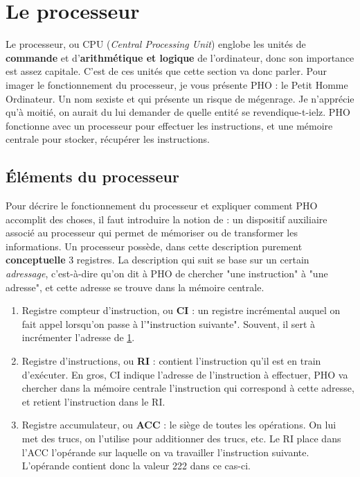 \documentclass[12pt,a4paper]{report}
\begin{document}
\section{Le processeur}
Le processeur, ou CPU (\textit{Central Processing Unit}) englobe les unités de \textbf{commande} et d'\textbf{arithmétique et logique} de l'ordinateur, donc son importance est assez capitale. C'est de ces unités que cette section va donc parler. Pour imager le fonctionnement du processeur, je vous présente PHO : le Petit Homme Ordinateur. Un nom sexiste et qui présente un risque de mégenrage. Je n'apprécie qu'à moitié, on aurait du lui demander de quelle entité se revendique-t-ielz. PHO fonctionne avec un processeur pour effectuer les instructions, et une mémoire centrale pour stocker, récupérer les instructions.
\subsection{Éléments du processeur}
Pour décrire le fonctionnement du processeur et expliquer comment PHO accomplit des choses, il faut introduire la notion de  : un dispositif auxiliaire associé au processeur qui permet de mémoriser ou de transformer les informations. Un processeur possède, dans cette description purement \textbf{conceptuelle} 3 registres. La description qui suit se base sur un certain \textit{adressage}, c'est-à-dire qu'on dit à PHO de chercher "une instruction" à "une adresse", et cette adresse se trouve dans la mémoire centrale. \\
\begin{enumerate}
\item Registre compteur d'instruction, ou \textbf{CI} : un registre incrémental auquel on fait appel lorsqu'on passe à l'"instruction suivante". Souvent, il sert à incrémenter l'adresse de \underline{1}.
\item Registre d'instructions, ou \textbf{RI} : contient l'instruction qu'il est en train d'exécuter. En gros, CI indique l'adresse de l'instruction à effectuer, PHO va chercher dans la mémoire centrale l'instruction qui correspond à cette adresse, et retient l'instruction dans le RI.
\item Registre accumulateur, ou \textbf{ACC} : le siège de toutes les opérations. On lui met des trucs, on l'utilise pour additionner des trucs, etc. Le RI place dans l'ACC l'opérande sur laquelle on va travailler l'instruction suivante. L'opérande contient donc la valeur 222 dans ce cas-ci.  \\
\end{enumerate}
\end{document}

